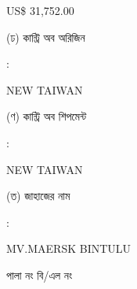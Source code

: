 \documentclass[12pt]{article}
\newcommand{\price}{US\$ 31,752.00}
\newcommand{\co}{NEW TAIWAN}
\newcommand{\coship}{NEW TAIWAN}
\newcommand{\vessel}{MV.MAERSK BINTULU}
\begin{document}
\begin{minipage}[t]{0.53\linewidth}
{\price}
\\
\end{minipage}
\begin{minipage}[t]{0.05\linewidth}
\hspace*{1em}
\end{minipage}
\begin{minipage}[t]{0.40\linewidth}
(ঢ) কান্ট্রি অব অরিজিন
\end{minipage}
\begin{minipage}[t]{0.02\linewidth}
:
\end{minipage}
\begin{minipage}[t]{0.53\linewidth}
{\co}
\\
\end{minipage}
\begin{minipage}[t]{0.05\linewidth}
\hspace*{1em}
\end{minipage}
\begin{minipage}[t]{0.40\linewidth}
(ণ) কান্ট্রি অব শিপমেন্ট
\end{minipage}
\begin{minipage}[t]{0.02\linewidth}
:
\end{minipage}
\begin{minipage}[t]{0.53\linewidth}
{\coship}
\\
\end{minipage}
\begin{minipage}[t]{0.05\linewidth}
\hspace*{1em}
\end{minipage}
\begin{minipage}[t]{0.40\linewidth}
(ত) জাহাজের নাম
\end{minipage}
\begin{minipage}[t]{0.02\linewidth}
:
\end{minipage}
\begin{minipage}[t]{0.53\linewidth}
{\vessel}
\end{minipage}
\begin{minipage}[t]{0.05\linewidth}
\hspace*{1em}
\end{minipage}
\begin{minipage}[t]{0.40\linewidth}
\hspace*{1.8em}পালা নং বি/এল নং
\end{minipage}
\begin{minipage}[t]{0.02\linewidth}
\hspace{1em}
\end{minipage}
\end{document}
